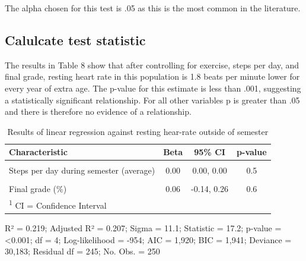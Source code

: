 \documentclass[preprint, 3p,
authoryear]{elsarticle} %
\begin{document}
The alpha chosen for this test is .05 as this is the most common in the
literature.

\hypertarget{calulcate-test-statistic-3}{%
\subsection{Calulcate test statistic}\label{calulcate-test-statistic-3}}

The results in Table 8 show that after controlling for exercise, steps
per day, and final grade, resting heart rate in this population is 1.8
beats per minute lower for every year of extra age. The p-value for this
estimate is less than .001, suggesting a statistically significant
relationship. For all other variables p is greater than .05 and there is
therefore no evidence of a relationship.

\begin{table}

\begin{threeparttable}
\caption{\label{tab:unnamed-chunk-11}Results of linear regression against resting hear-rate outside of semester}
\centering
\fontsize{7}{9}\selectfont
\begin{tabular}[t]{l|c|c|c}
\hline
\textbf{\textbf{Characteristic}} & \textbf{\textbf{Beta}} & \textbf{\textbf{95\% CI}} & \textbf{\textbf{p-value}}\\
\hline
\cellcolor{gray!6}{Age} & \cellcolor{gray!6}{-1.8} & \cellcolor{gray!6}{-2.2, -1.3} & \cellcolor{gray!6}{<0.001}\\
\hline
Steps per day during semester (average) & 0.00 & 0.00, 0.00 & 0.5\\
\hline
\cellcolor{gray!6}{Exercise during semsester (minutes per week)} & \cellcolor{gray!6}{0.01} & \cellcolor{gray!6}{-0.04, 0.07} & \cellcolor{gray!6}{0.6}\\
\hline
Final grade (\%) & 0.06 & -0.14, 0.26 & 0.6\\
\hline
\multicolumn{4}{l}{\rule{0pt}{1em}\textsuperscript{1} CI = Confidence Interval}\\
\end{tabular}
\begin{tablenotes}
\small
\item [] R² = 0.219; Adjusted R² = 0.207; Sigma = 11.1; Statistic = 17.2; p-value = <0.001; df = 4; Log-likelihood = -954; AIC = 1,920; BIC = 1,941; Deviance = 30,183; Residual df = 245; No. Obs. = 250
\end{tablenotes}
\end{threeparttable}
\end{table}
\end{document}
